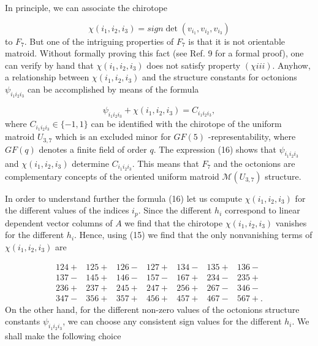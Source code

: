 \documentclass[a4paper,12pt]{article}
\begin{document}
In principle, we can associate the chirotope

\begin{equation}
\chi (i_{1},i_{2},i_{3})=sign\det (v_{i_{1}},v_{i_{2}},v_{i_{3}})  \label{15}
\end{equation}
to $F_{7}$. But one of the intriguing properties of $F_{7}$ is that it is
not orientable matroid. Without formally proving this fact (see Ref. 9 for a
formal proof), one can verify by hand that $\chi (i_{1},i_{2},i_{3})$ does
not satisfy property $(\chi iii)$. Anyhow, a relationship between $\chi
(i_{1},i_{2},i_{3})$ and the structure constants for octonions $\psi
_{i_{1}i_{2}i_{3}}$ can be accomplished by means of the formula

\begin{equation}
\psi _{i_{1}i_{2}i_{3}}+\chi (i_{1},i_{2},i_{3})=C_{i_{1}i_{2}i_{3}},
\label{16}
\end{equation}
where $C_{i_{1}i_{2}i_{3}}\in \{-1,1\}$ can be identified with the chirotope
of the uniform matroid $U_{3,7}$ which is an excluded minor for $GF(5)$%
-representability, where $GF(q)$ denotes a finite field of order $q.$ The
expression (16) shows that $\psi _{i_{1}i_{2}i_{3}}$ and $\chi
(i_{1},i_{2},i_{3})$ determine $C_{i_{1}i_{2}i_{3}}$. This means that $F_{7}$
and the octonions are complementary concepts of the oriented uniform matroid 
$\mathcal{M}(U_{3,7})$ structure.

In order to understand further the formula (16) let us compute $\chi
(i_{1},i_{2},i_{3})$ for the different values of the indices $i_{p}$. Since
the different $h_{i}$ correspond to linear dependent vector columns of $A$
we find that the chirotope $\chi (i_{1},i_{2},i_{3})$ vanishes for the
different $h_{i}$. Hence, using (15) we find that the only nonvanishing
terms of $\chi (i_{1},i_{2},i_{3})$ are

\begin{equation}
\begin{array}{ccccccc}
124+ & 125+ & 126- & 127+ & 134- & 135+ & 136- \\ 
137- & 145+ & 146- & 157- & 167+ & 234- & 235+ \\ 
236+ & 237+ & 245+ & 247+ & 256+ & 267- & 346- \\ 
347- & 356+ & 357+ & 456+ & 457+ & 467- & 567+.
\end{array}
\label{17}
\end{equation}
On the other hand, for the different non-zero values of the octonions
structure constants $\psi _{i_{1}i_{2}i_{3}}$, we can choose any consistent
sign values for the different $h_{i}$. We shall make the following choice
\end{document}
